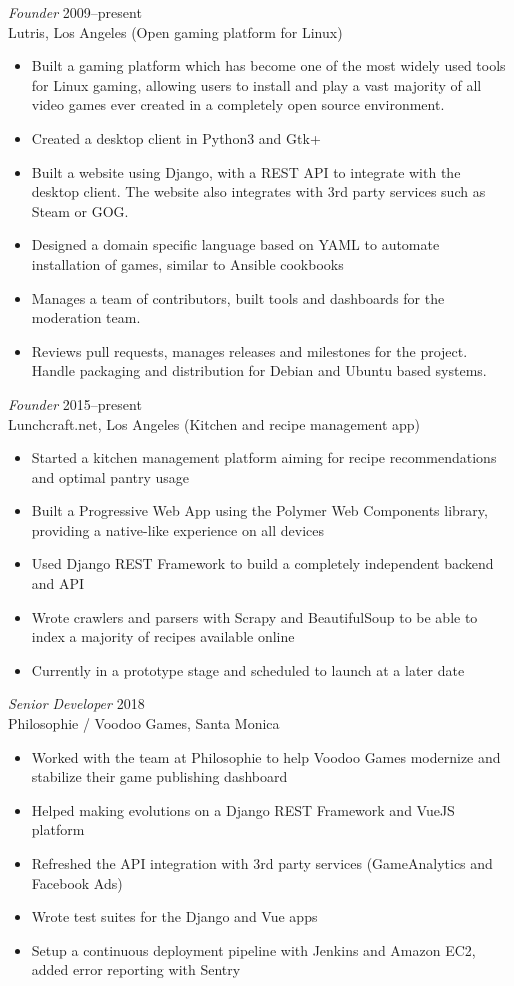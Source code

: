 \documentclass[line,resmargin]{res}
\begin{document}
\begin{resume}
{\sl Founder\/} \hfill 2009--present\\
Lutris, Los Angeles (Open gaming platform for Linux)
\begin{itemize} \itemsep -2pt
\item Built a gaming platform which has become one of the most widely used tools for Linux gaming, allowing users to install and play a vast majority of all video games ever created in a completely open source environment.
\item Created a desktop client in Python3 and Gtk+
\item Built a website using Django, with a REST API to integrate with the desktop client. The website also integrates with 3rd party services such as Steam or GOG.
\item Designed a domain specific language based on YAML to automate installation of games, similar to Ansible cookbooks
\item Manages a team of contributors, built tools and dashboards for the moderation team.
\item Reviews pull requests, manages releases and milestones for the project. Handle packaging and distribution for Debian and Ubuntu based systems.
\end{itemize}

{\sl Founder\/} \hfill 2015--present\\
Lunchcraft.net, Los Angeles (Kitchen and recipe management app)
\begin{itemize} \itemsep -2pt
    \item Started a kitchen management platform aiming for recipe recommendations and optimal pantry usage
    \item Built a Progressive Web App using the Polymer Web Components library, providing a native-like experience on all devices
    \item Used Django REST Framework to build a completely independent backend and API
    \item Wrote crawlers and parsers with Scrapy and BeautifulSoup to be able to index a majority of recipes available online
    \item Currently in a prototype stage and scheduled to launch at a later date
\end{itemize}

{\sl Senior Developer\/} \hfill 2018\\
Philosophie / Voodoo Games, Santa Monica
\begin{itemize} \itemsep -2pt
\item Worked with the team at Philosophie to help Voodoo Games modernize and stabilize their game publishing dashboard
\item Helped making evolutions on a Django REST Framework and VueJS platform
\item Refreshed the API integration with 3rd party services (GameAnalytics and Facebook Ads)
\item Wrote test suites for the Django and Vue apps
\item Setup a continuous deployment pipeline with Jenkins and Amazon EC2, added error reporting with Sentry
\end{itemize}


\end{resume}
\end{document}
